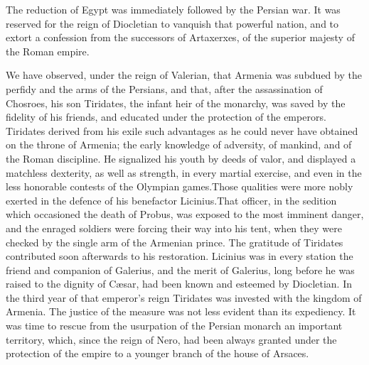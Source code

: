 


The reduction of Egypt was immediately followed by the Persian
war. It was reserved for the reign of Diocletian to vanquish that
powerful nation, and to extort a confession from the successors
of Artaxerxes, of the superior majesty of the Roman empire.

We have observed, under the reign of Valerian, that Armenia was
subdued by the perfidy and the arms of the Persians, and that,
after the assassination of Chosroes, his son Tiridates, the
infant heir of the monarchy, was saved by the fidelity of his
friends, and educated under the protection of the emperors.
Tiridates derived from his exile such advantages as he could
never have obtained on the throne of Armenia; the early knowledge
of adversity, of mankind, and of the Roman discipline. He
signalized his youth by deeds of valor, and displayed a matchless
dexterity, as well as strength, in every martial exercise, and
even in the less honorable contests of the Olympian games.\footnotemark[52]
Those qualities were more nobly exerted in the defence of his
benefactor Licinius.\footnotemark[53] That officer, in the sedition which
occasioned the death of Probus, was exposed to the most imminent
danger, and the enraged soldiers were forcing their way into his
tent, when they were checked by the single arm of the Armenian
prince. The gratitude of Tiridates contributed soon afterwards to
his restoration. Licinius was in every station the friend and
companion of Galerius, and the merit of Galerius, long before he
was raised to the dignity of Cæsar, had been known and esteemed
by Diocletian. In the third year of that emperor’s reign
Tiridates was invested with the kingdom of Armenia. The justice
of the measure was not less evident than its expediency. It was
time to rescue from the usurpation of the Persian monarch an
important territory, which, since the reign of Nero, had been
always granted under the protection of the empire to a younger
branch of the house of Arsaces.\footnotemark[54]

